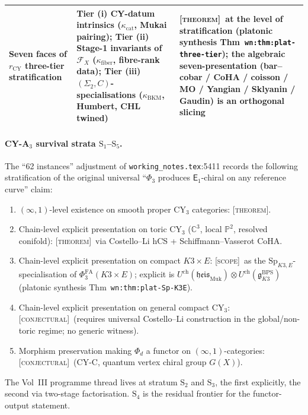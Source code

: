 \documentclass[11pt]{article}
\theoremstyle{definition}
\theoremstyle{remark}
\providecommand{\C}{\mathbb{C}}
\providecommand{\cF}{\mathcal{F}}
\providecommand{\fg}{\mathfrak{g}}
\providecommand{\fheis}{\mathfrak{heis}}
\providecommand{\Sp}{\mathrm{Sp}}
\providecommand{\Phifa}{\Phi^{\mathrm{FA}}}
\providecommand{\Eone}{\mathsf{E}_1}
\providecommand{\kcat}{\kappa_{\mathrm{cat}}}
\providecommand{\kBKM}{\kappa_{\mathrm{BKM}}}
\providecommand{\kfib}{\kappa_{\mathrm{fiber}}}
\providecommand{\ClaimStatusTheorem}{\textsc{[theorem]}}
\providecommand{\ClaimStatusConjectured}{\textsc{[conjectural]}}
\providecommand{\ClaimStatusScope}{\textsc{[scope]}}
\begin{document}
\begin{longtable}{@{}p{3.5cm}p{6.0cm}p{5.5cm}@{}}
\textbf{Seven faces of $r_{\mathrm{CY}}$ three-tier stratification}
& Tier (i) CY-datum intrinsics ($\kcat$, Mukai pairing);
Tier (ii) Stage-1 invariants of $\cF_X$ ($\kfib$, fibre-rank data);
Tier (iii) $(\Sigma_2,C)$-specialisations ($\kBKM$, Humbert,
CHL twined)
& \ClaimStatusTheorem\ at the level of stratification
(platonic synthesis Thm~\texttt{wn:thm:plat-three-tier}); the
algebraic seven-presentation (bar--cobar / CoHA / coisson / MO /
Yangian / Sklyanin / Gaudin) is an orthogonal slicing
\\
\bottomrule
\end{longtable}

\paragraph{CY-A$_3$ survival strata $\mathrm{S}_1$--$\mathrm{S}_5$.}
The ``62 instances'' adjustment of \texttt{working\_notes.tex}:5411
records the following stratification of the original universal
``$\Phi_3$ produces $\Eone$-chiral on any reference curve'' claim:

\begin{enumerate}[label=$\mathrm{S}_\arabic*$.,leftmargin=2em]
\item $(\infty,1)$-level existence on smooth proper CY$_3$ categories:
\ClaimStatusTheorem.
\item Chain-level explicit presentation on toric CY$_3$ ($\C^3$, local
$\mathbb{P}^2$, resolved conifold): \ClaimStatusTheorem\ via
Costello--Li hCS + Schiffmann--Vasserot CoHA.
\item Chain-level explicit presentation on compact $K3\times E$:
\ClaimStatusScope\ as the $\Sp_{K3,E}$-specialisation of
$\Phifa_3(K3\times E)$; explicit is
$U^{\mathrm{ch}}(\fheis_{\mathrm{Muk}})\otimes
U^{\mathrm{ch}}(\fg^{\mathrm{BPS}}_{K3})$ (platonic synthesis
Thm~\texttt{wn:thm:plat-Sp-K3E}).
\item Chain-level explicit presentation on general compact CY$_3$:
\ClaimStatusConjectured\ (requires universal Costello--Li
construction in the global/non-toric regime; no generic witness).
\item Morphism preservation making $\Phi_d$ a functor on
$(\infty,1)$-categories: \ClaimStatusConjectured\ (CY-C, quantum
vertex chiral group $G(X)$).
\end{enumerate}

The Vol~III programme thread lives at stratum $\mathrm{S}_2$ and
$\mathrm{S}_3$, the first explicitly, the second via two-stage
factorisation. $\mathrm{S}_4$ is the residual frontier for the
functor-output statement.
\end{document}
